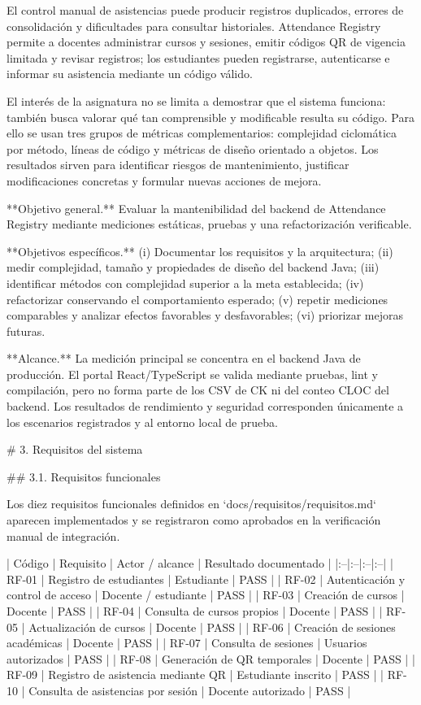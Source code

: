El control manual de asistencias puede producir registros duplicados, errores de consolidación y dificultades para consultar historiales. Attendance Registry permite a docentes administrar cursos y sesiones, emitir códigos QR de vigencia limitada y revisar registros; los estudiantes pueden registrarse, autenticarse e informar su asistencia mediante un código válido.

El interés de la asignatura no se limita a demostrar que el sistema funciona: también busca valorar qué tan comprensible y modificable resulta su código. Para ello se usan tres grupos de métricas complementarios: complejidad ciclomática por método, líneas de código y métricas de diseño orientado a objetos. Los resultados sirven para identificar riesgos de mantenimiento, justificar modificaciones concretas y formular nuevas acciones de mejora.

**Objetivo general.** Evaluar la mantenibilidad del backend de Attendance Registry mediante mediciones estáticas, pruebas y una refactorización verificable.

**Objetivos específicos.** (i) Documentar los requisitos y la arquitectura; (ii) medir complejidad, tamaño y propiedades de diseño del backend Java; (iii) identificar métodos con complejidad superior a la meta establecida; (iv) refactorizar conservando el comportamiento esperado; (v) repetir mediciones comparables y analizar efectos favorables y desfavorables; (vi) priorizar mejoras futuras.

**Alcance.** La medición principal se concentra en el backend Java de producción. El portal React/TypeScript se valida mediante pruebas, lint y compilación, pero no forma parte de los CSV de CK ni del conteo CLOC del backend. Los resultados de rendimiento y seguridad corresponden únicamente a los escenarios registrados y al entorno local de prueba.

# 3. Requisitos del sistema

## 3.1. Requisitos funcionales

Los diez requisitos funcionales definidos en `docs/requisitos/requisitos.md` aparecen implementados y se registraron como aprobados en la verificación manual de integración.

| Código | Requisito | Actor / alcance | Resultado documentado |
|:--|:--|:--|:--|
| RF-01 | Registro de estudiantes | Estudiante | PASS |
| RF-02 | Autenticación y control de acceso | Docente / estudiante | PASS |
| RF-03 | Creación de cursos | Docente | PASS |
| RF-04 | Consulta de cursos propios | Docente | PASS |
| RF-05 | Actualización de cursos | Docente | PASS |
| RF-06 | Creación de sesiones académicas | Docente | PASS |
| RF-07 | Consulta de sesiones | Usuarios autorizados | PASS |
| RF-08 | Generación de QR temporales | Docente | PASS |
| RF-09 | Registro de asistencia mediante QR | Estudiante inscrito | PASS |
| RF-10 | Consulta de asistencias por sesión | Docente autorizado | PASS |

